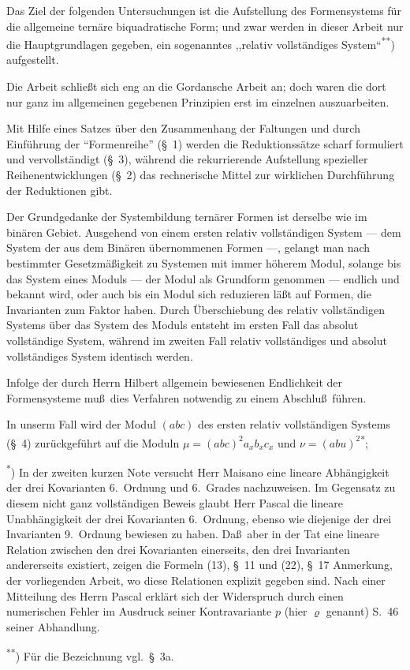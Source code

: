 \documentclass[11pt,a4paper]{article}
\theoremstyle{plain}
\theoremstyle{definition}
\begin{document}
\vspace{0.5cm}

Das Ziel der folgenden Untersuchungen ist die Aufstellung des Formensystems f\"ur die allgemeine tern\"are biquadratische Form; und zwar werden in dieser Arbeit nur die Hauptgrundlagen gegeben, ein sogenanntes ,,relativ vollst\"andiges System``\textsuperscript{**}) aufgestellt.

Die Arbeit schlie\ss t sich eng an die Gordansche Arbeit an; doch waren die dort nur ganz im allgemeinen gegebenen Prinzipien erst im einzelnen auszuarbeiten.

Mit Hilfe eines Satzes \"uber den Zusammenhang der Faltungen und durch Einf\"uhrung der ``Formenreihe'' (\S~1) werden die Reduktionss\"atze scharf formuliert und vervollst\"andigt (\S~3), w\"ahrend die rekurrierende Aufstellung spezieller Reihenentwicklungen (\S~2) das rechnerische Mittel zur wirklichen Durchf\"uhrung der Reduktionen gibt.

Der Grundgedanke der Systembildung tern\"arer Formen ist derselbe wie im bin\"aren Gebiet. Ausgehend von einem ersten relativ vollst\"andigen System --- dem System der aus dem Bin\"aren \"ubernommenen Formen ---, gelangt man nach bestimmter Gesetzm\"a\ss igkeit zu Systemen mit immer h\"oherem Modul, solange bis das System eines Moduls --- der Modul als Grundform genommen --- endlich und bekannt wird, oder auch bis ein Modul sich reduzieren l\"a\ss t auf Formen, die Invarianten zum Faktor haben. Durch \"Uberschiebung des relativ vollst\"andigen Systems \"uber das System des Moduls entsteht im ersten Fall das absolut vollst\"andige System, w\"ahrend im zweiten Fall relativ vollst\"andiges und absolut vollst\"andiges System identisch werden.

Infolge der durch Herrn Hilbert allgemein bewiesenen Endlichkeit der Formensysteme mu\ss\ dies Verfahren notwendig zu einem Abschlu\ss\ f\"uhren.

In unserm Fall wird der Modul $(abc)$ des ersten relativ vollst\"andigen Systems (\S~4) zur\"uckgef\"uhrt auf die Moduln $\mu = (abc)^2 a_x b_x c_x$ und $\nu = (abu)^2$\textsuperscript{*};

\begin{footnotesize}
\noindent\textsuperscript{*}) In der zweiten kurzen Note versucht Herr Maisano eine lineare Abh\"angigkeit der drei Kovarianten 6.~Ordnung und 6.~Grades nachzuweisen. Im Gegensatz zu diesem nicht ganz vollst\"andigen Beweis glaubt Herr Pascal die lineare Unabh\"angigkeit der drei Kovarianten 6.~Ordnung, ebenso wie diejenige der drei Invarianten 9.~Ordnung bewiesen zu haben. Da\ss\ aber in der Tat eine lineare Relation zwischen den drei Kovarianten einerseits, den drei Invarianten andererseits existiert, zeigen die Formeln (13), \S~11 und (22), \S~17 Anmerkung, der vorliegenden Arbeit, wo diese Relationen explizit gegeben sind. Nach einer Mitteilung des Herrn Pascal erkl\"art sich der Widerspruch durch einen numerischen Fehler im Ausdruck seiner Kontravariante $p$ (hier $\varrho$ genannt) S.~46 seiner Abhandlung.

\noindent\textsuperscript{**}) F\"ur die Bezeichnung vgl.~\S~3a.
\end{footnotesize}
\end{document}
